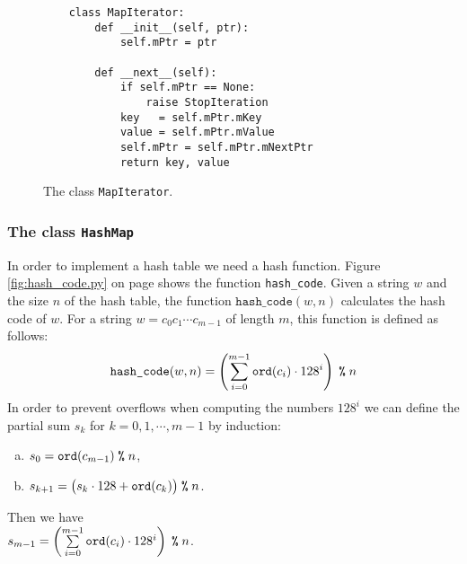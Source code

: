 \begin{figure}[!ht]
\centering
\begin{verbatim}
    class MapIterator:
        def __init__(self, ptr):
            self.mPtr = ptr
        
        def __next__(self):
            if self.mPtr == None:
                raise StopIteration
            key   = self.mPtr.mKey
            value = self.mPtr.mValue
            self.mPtr = self.mPtr.mNextPtr
            return key, value
\end{verbatim}
\vspace*{-0.3cm}
\caption{The class \texttt{MapIterator}.}
\label{fig:MapIterator.ipynb}
\end{figure}


\subsubsection{The class \texttt{HashMap}}
In order to implement a hash table we need a hash function.  Figure \ref{fig:hash_code.py} on page
\pageref{fig:hash_code.py} shows the function \texttt{hash\_code}.
Given a string $w$ and the size $n$ of the hash table, the function $\texttt{hash\_code}(w, n)$ calculates the
hash code of $w$.  For a string  
$w = c_0c_1\cdots c_{m-1}$ of length $m$, this function is defined as follows:
$$ \texttt{hash\_code}(w, n) = \left(\sum\limits_{i=0}^{m-1} \texttt{ord}(c_i) \cdot 128^i\right) \;\texttt{\symbol{37}}\; n  $$
In order to prevent overflows when computing the numbers $128^i$ we can define the partial sum $s_k$ for
$k=0,1,\cdots,m-1$ by induction:
\begin{enumerate}[(a)]
\item $s_{0} = \texttt{ord}(c_{m-1}) \;\texttt{\symbol{37}}\; n$,
\item $s_{k+1} = \bigl(s_k \cdot 128 + \texttt{ord}(c_{k}) \bigr) \;\texttt{\symbol{37}}\; n$.
\end{enumerate}
Then we have
\\[0.2cm]
\hspace*{1.3cm}
$s_{m-1} = \left(\sum\limits_{i=0}^{m-1} \texttt{ord}(c_i) \cdot 128^i\right) \;\texttt{\symbol{37}}\; n$.

